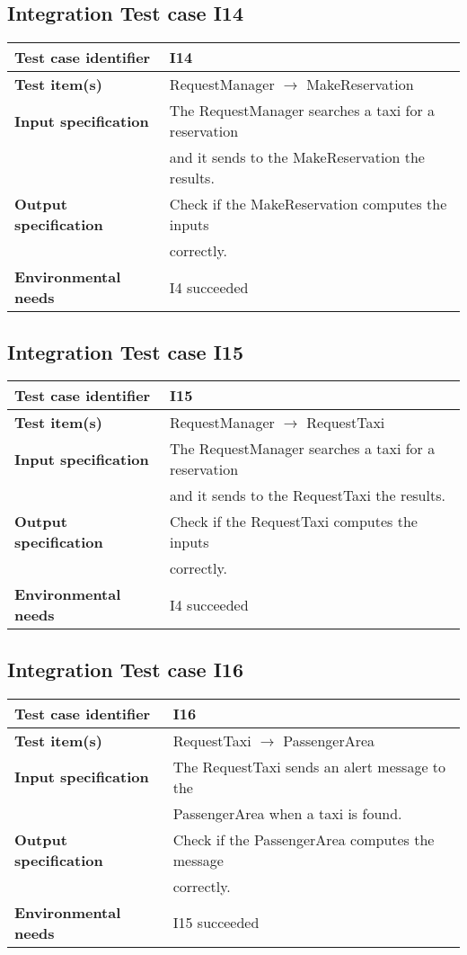 \documentclass[18pt,oneside,a4paper, titlepage]{article}
\begin{document}
	\subsection{Integration Test case I14}
		\begin{tabular}{ l l}
			\hline 		\textbf{Test case identifier} & I14 \\
			\hline		\textbf{Test item(s)}  & RequestManager $\rightarrow$ MakeReservation \\
			\hline		\textbf{Input specification} & The RequestManager searches a taxi for a reservation\\ & and it sends to the MakeReservation the results.\\
			\hline		\textbf{Output specification} & Check if the MakeReservation computes the inputs\\ & correctly.\\
			\hline		\textbf{Environmental needs} & I4 succeeded\\
			\hline
		\end{tabular}
	\subsection{Integration Test case I15}
		\begin{tabular}{ l l}
			\hline 		\textbf{Test case identifier} & I15 \\
			\hline		\textbf{Test item(s)}  & RequestManager $\rightarrow$ RequestTaxi \\
			\hline		\textbf{Input specification} & The RequestManager searches a taxi for a reservation\\ & and it sends to the RequestTaxi the results.\\
			\hline		\textbf{Output specification} & Check if the RequestTaxi computes the inputs\\ & correctly.\\
			\hline		\textbf{Environmental needs} & I4 succeeded\\
			\hline
		\end{tabular}
	\subsection{Integration Test case I16}
		\begin{tabular}{ l l}
			\hline 		\textbf{Test case identifier} & I16 \\
			\hline		\textbf{Test item(s)}  & RequestTaxi $\rightarrow$ PassengerArea \\
			\hline		\textbf{Input specification} & The RequestTaxi sends an alert message to the\\ & PassengerArea when a taxi is found.\\
			\hline		\textbf{Output specification} & Check if the PassengerArea computes the message\\ & correctly.\\
			\hline		\textbf{Environmental needs} & I15 succeeded\\
			\hline
		\end{tabular}
\end{document}
